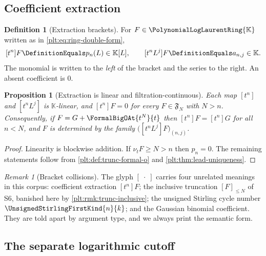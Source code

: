 \documentclass[11pt,oneside]{article}
\theoremstyle{plain}
\newtheorem{proposition}[theorem]{Proposition}
\theoremstyle{definition}
\newtheorem{definition}[theorem]{Definition}
\theoremstyle{remark}
\newtheorem{remark}[theorem]{Remark}
\newcommand{\K}{\mathbb{K}}
\newcommand{\PLlau}{\PolynomialLogLaurentRing{\K}}       %
\newcommand{\ordt}{\nu_{t}}                              %
\newcommand{\stirlingone}[2]{\UnsignedStirlingFirstKind{#1}{#2}}
\begin{document}
\subsection{Coefficient extraction}
\label{plt:sec:trunc-extraction}

\begin{definition}[Extraction brackets]
\label{plt:def:trunc-extraction}
For \(F\in\PLlau\) written as in \eqref{plt:eq:ring-double-form},
\begin{equation}\label{plt:eq:trunc-extraction}
  [t^n]F\DefinitionEquals p_n(L)\in\K[L],
  \qquad
  [t^nL^j]F\DefinitionEquals a_{n,j}\in\K .
\end{equation}
The monomial is written to the \emph{left} of the bracket and the series to
the right.  An absent coefficient is \(0\).
\end{definition}

\begin{proposition}[Extraction is linear and filtration-continuous]
\label{plt:prop:trunc-extraction}
Each map \([t^n]\) and \([t^nL^j]\) is \(\K\)-linear, and
\([t^n]F=0\) for every \(F\in\mathfrak F_N\) with \(N>n\).  Consequently, if
\(F=G+\FormalBigOAt{t^N}{t}\) then \([t^n]F=[t^n]G\) for all \(n<N\), and
\(F\) is determined by the family \(\bigl([t^nL^j]F\bigr)_{(n,j)}\).
\end{proposition}

\begin{proof}
Linearity is blockwise addition.  If \(\ordt F\ge N>n\) then \(p_n=0\).  The
remaining statements follow from
\cref{plt:def:trunc-formal-o} and
\cref{plt:thm:lead-uniqueness}.
\end{proof}

\begin{remark}[Bracket collisions]
\label{plt:rmk:trunc-bracket}
The glyph \([\;\cdot\;]\) carries four unrelated meanings in this corpus:
coefficient extraction \([t^n]F\); the inclusive truncation \([F]_{\le N}\) of
S6, banished here by \cref{plt:rmk:trunc-inclusive}; the unsigned Stirling
cycle number \(\stirlingone{n}{k}\); and the Gaussian binomial coefficient.
They are told apart by argument type, and we always print the semantic form.
\end{remark}

\subsection{The separate logarithmic cutoff}
\label{plt:sec:trunc-log-cutoff}
\end{document}
